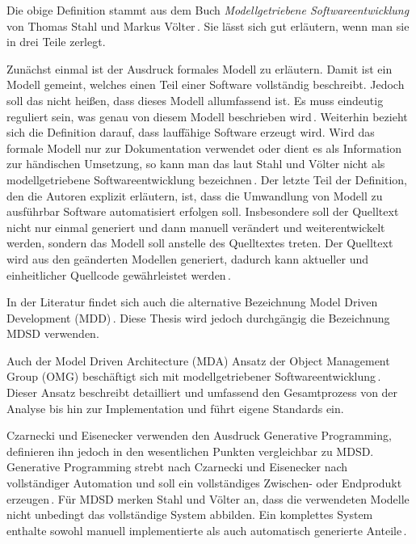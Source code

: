 \documentclass[12pt,oneside,a4paper,parskip]{scrbook}
\begin{document}
Die obige Definition stammt aus dem Buch \textit{Modellgetriebene Softwareentwicklung} von Thomas Stahl und Markus Völter\,\cite[S.\,11]{stahl2007}. Sie lässt sich gut erläutern, wenn man sie in drei Teile zerlegt.

Zunächst einmal ist der Ausdruck formales Modell zu erläutern. Damit ist ein Modell gemeint, welches einen Teil einer Software vollständig beschreibt. Jedoch soll das nicht heißen, dass dieses Modell allumfassend ist. Es muss eindeutig reguliert sein, was genau von diesem Modell beschrieben wird\,\cite[S.\,11f.]{stahl2007}. Weiterhin bezieht sich die Definition darauf, dass lauffähige Software erzeugt wird. Wird das formale Modell nur zur Dokumentation verwendet oder dient es als Information zur händischen Umsetzung, so kann man das laut Stahl und Völter nicht als modellgetriebene Softwareentwicklung bezeichnen\,\cite[S.\,12]{stahl2007}. Der letzte Teil der Definition, den die Autoren explizit erläutern, ist, dass die Umwandlung von Modell zu ausführbar Software automatisiert erfolgen soll. Insbesondere soll der Quelltext nicht nur einmal generiert und dann manuell verändert und weiterentwickelt werden, sondern das Modell soll anstelle des Quelltextes treten. Der Quelltext wird aus den geänderten Modellen generiert, dadurch kann aktueller und einheitlicher Quellcode gewährleistet werden\,\cite[S.\,13]{stahl2007}.

In der Literatur findet sich auch die alternative Bezeichnung Model Driven Development (MDD)\,\cite{selic2003,atkinson2003}. Diese Thesis wird jedoch durchgängig die Bezeichnung MDSD verwenden.

Auch der Model Driven Architecture (MDA) Ansatz der Object Management Group (OMG) beschäftigt sich mit modellgetriebener Softwareentwicklung\,\cite{mdaguide}. Dieser Ansatz beschreibt detailliert und umfassend den Gesamtprozess von der Analyse bis hin zur Implementation und führt eigene Standards ein.

Czarnecki und Eisenecker verwenden den Ausdruck Generative Programming, definieren ihn jedoch in den wesentlichen Punkten vergleichbar zu MDSD. Generative Programming strebt nach Czarnecki und Eisenecker nach vollständiger Automation und soll ein vollständiges Zwischen- oder Endprodukt erzeugen\,\cite[S.\,5]{czaeis2000}. Für MDSD merken Stahl und Völter an, dass die verwendeten Modelle nicht unbedingt das vollständige System abbilden. Ein komplettes System enthalte sowohl manuell implementierte als auch automatisch generierte Anteile\,\cite[S.\,13]{stahl2007}.
\end{document}
